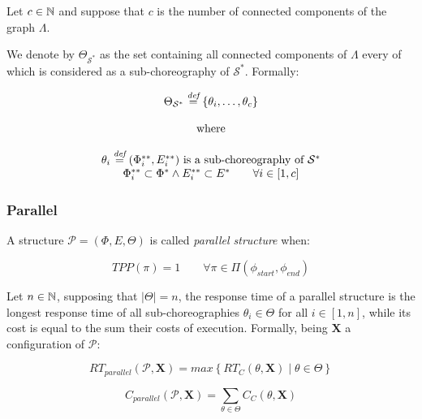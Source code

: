 Let $c \in \mathbb{N}$ and suppose that $c$ is the number of connected components of the graph $\Lambda$.

We denote by $\Theta_{\mathcal{S}^*}$ as the set containing all connected components of $\Lambda$ every of which is considered as a sub-choreography of $\mathcal{S}^*$. Formally:

\begin{equation}
	\begin{array}{c}
		\Theta_{\mathcal{S}^*} \overset{\textit{def}}{=} \left\lbrace \theta_i, \ldots ,\theta_c \right\rbrace \\\\
		\text{ where } \\\\
		
		\theta_i \overset{\textit{def}}{=} (\Phi^{**}_i, E^{**}_i) \text{ is a sub-choreography of } \mathcal{S}^* \\
		 \Phi^{**}_i \subset \Phi^{*} \wedge E^{**}_i \subset E^{*} \qquad \forall i \in \left[ 1, c \right] \\
	\end{array}
\end{equation} 

\subsubsection{Parallel}

A structure $\mathcal{P} = (\Phi,E,\Theta)$ is called \textit{parallel structure} when:

\begin{equation}
	TPP(\pi) = 1 \qquad \forall \pi \in \Pi(\phi_{start}, \phi_{end})
\end{equation}

Let $n \in \mathbb{N}$, supposing that $|\Theta| = n$, the response time of a parallel structure is the longest response time of all sub-choreographies $\theta_i \in \Theta$ for all $i \in \left[ 1, n \right]$, while its cost is equal to the sum their costs of execution. Formally, being $\textbf{X}$ a configuration of  $\mathcal{P}$:

\begin{equation}
	RT_{parallel}(\mathcal{P}, \textbf{X}) = max \left\lbrace RT_C(\mathcal{\theta}, \textbf{X}) \mid \theta \in \Theta \right\rbrace 
\end{equation}

\begin{equation}
	C_{parallel}(\mathcal{P}, \textbf{X}) = \sum_{\theta \in \Theta} C_C(\theta, \textbf{X})
\end{equation}



